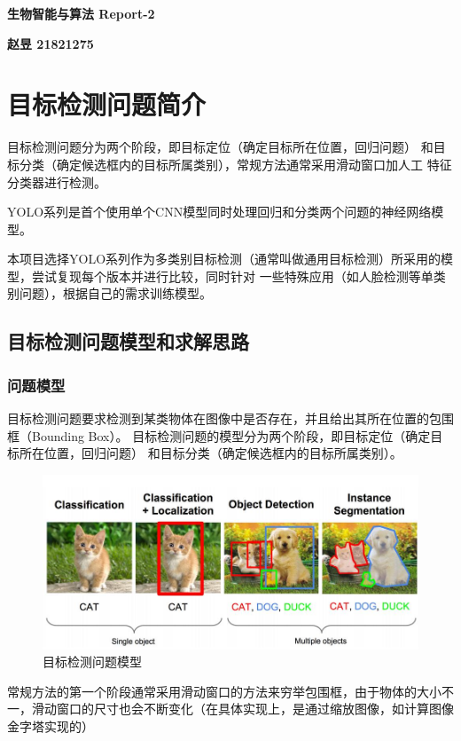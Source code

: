 \documentclass[a4paper, notitlepage]{article}
\begin{document}
\setlength{\parindent}{0pt}
\begin{center}
	\LARGE\textbf{生物智能与算法 Report-2}
\end{center}
\vspace{1em}

\begin{center}
	\textbf{赵昱 21821275}
\end{center}

\setlength{\parindent}{2em}

\section{目标检测问题简介}
目标检测问题分为两个阶段，即目标定位（确定目标所在位置，回归问题）
和目标分类（确定候选框内的目标所属类别），常规方法通常采用滑动窗口加人工
特征分类器进行检测。

YOLO系列\cite{1,2,3}是首个使用单个CNN模型同时处理回归和分类两个问题的神经网络模型。

本项目选择YOLO系列作为多类别目标检测（通常叫做通用目标检测）所采用的模型，尝试复现每个版本并进行比较，同时针对
一些特殊应用（如人脸检测等单类别问题），根据自己的需求训练模型。

\subsection{目标检测问题模型和求解思路}
\subsubsection{问题模型}
目标检测问题要求检测到某类物体在图像中是否存在，并且给出其所在位置的包围框（Bounding Box）。
目标检测问题的模型分为两个阶段，即目标定位（确定目标所在位置，回归问题） 和目标分类（确定候选框内的目标所属类别）。
\begin{figure}[H]
    \centering
    \includegraphics[scale=0.4]{fig_problem_model}
    \caption{目标检测问题模型}
    \label{fig:example}
\end{figure}
常规方法的第一个阶段通常采用滑动窗口的方法来穷举包围框，由于物体的大小不一，滑动窗口的尺寸也会不断变化（在具体实现上，是通过缩放图像，如计算图像金字塔实现的）
\end{document}
